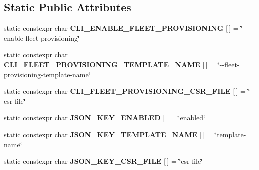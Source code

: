 \subsection*{Static Public Attributes}
\begin{DoxyCompactItemize}
\item 
\mbox{\label{struct_aws_1_1_iot_1_1_device_client_1_1_plain_config_1_1_fleet_provisioning_ace3f843577e0601b349e6d764d627cc3}} 
static constexpr char {\bfseries C\+L\+I\+\_\+\+E\+N\+A\+B\+L\+E\+\_\+\+F\+L\+E\+E\+T\+\_\+\+P\+R\+O\+V\+I\+S\+I\+O\+N\+I\+NG} \mbox{[}$\,$\mbox{]} = \char`\"{}-\/-\/enable-\/fleet-\/provisioning\char`\"{}
\item 
\mbox{\label{struct_aws_1_1_iot_1_1_device_client_1_1_plain_config_1_1_fleet_provisioning_a27307f285cc3492fa57a386e9a0e0dc0}} 
static constexpr char {\bfseries C\+L\+I\+\_\+\+F\+L\+E\+E\+T\+\_\+\+P\+R\+O\+V\+I\+S\+I\+O\+N\+I\+N\+G\+\_\+\+T\+E\+M\+P\+L\+A\+T\+E\+\_\+\+N\+A\+ME} \mbox{[}$\,$\mbox{]} = \char`\"{}-\/-\/fleet-\/provisioning-\/template-\/name\char`\"{}
\item 
\mbox{\label{struct_aws_1_1_iot_1_1_device_client_1_1_plain_config_1_1_fleet_provisioning_ad726b82b71fe54991fc504950e037382}} 
static constexpr char {\bfseries C\+L\+I\+\_\+\+F\+L\+E\+E\+T\+\_\+\+P\+R\+O\+V\+I\+S\+I\+O\+N\+I\+N\+G\+\_\+\+C\+S\+R\+\_\+\+F\+I\+LE} \mbox{[}$\,$\mbox{]} = \char`\"{}-\/-\/csr-\/file\char`\"{}
\item 
\mbox{\label{struct_aws_1_1_iot_1_1_device_client_1_1_plain_config_1_1_fleet_provisioning_a83741cd0f81dabd25027bed41f9259dc}} 
static constexpr char {\bfseries J\+S\+O\+N\+\_\+\+K\+E\+Y\+\_\+\+E\+N\+A\+B\+L\+ED} \mbox{[}$\,$\mbox{]} = \char`\"{}enabled\char`\"{}
\item 
\mbox{\label{struct_aws_1_1_iot_1_1_device_client_1_1_plain_config_1_1_fleet_provisioning_a209b4a1c48271137b0f32ba13e5355b5}} 
static constexpr char {\bfseries J\+S\+O\+N\+\_\+\+K\+E\+Y\+\_\+\+T\+E\+M\+P\+L\+A\+T\+E\+\_\+\+N\+A\+ME} \mbox{[}$\,$\mbox{]} = \char`\"{}template-\/name\char`\"{}
\item 
\mbox{\label{struct_aws_1_1_iot_1_1_device_client_1_1_plain_config_1_1_fleet_provisioning_a62f3cf93a81adfe4ac579c979c0f465b}} 
static constexpr char {\bfseries J\+S\+O\+N\+\_\+\+K\+E\+Y\+\_\+\+C\+S\+R\+\_\+\+F\+I\+LE} \mbox{[}$\,$\mbox{]} = \char`\"{}csr-\/file\char`\"{}
\end{DoxyCompactItemize}



